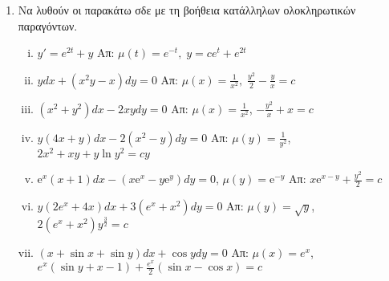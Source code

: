 \begin{enumerate}
  \item Να λυθούν οι παρακάτω σδε με τη βοήθεια κατάλληλων ολοκληρωτικών παραγόντων.

    \begin{enumerate}[i)]

      \item $ y' = e^{2t}+y $ \hfill Απ: $ \mu (t) = e^{-t}, \; y=ce^{t}+e^{2t} $ 
      \item $ ydx+(x^{2}y-x)dy=0 $ \hfill Απ: $ \mu (x) = \frac{1}{x^{2}}, \;
        \frac{y^{2}}{2} - \frac{y}{x} = c $ 
      \item $ (x^{2}+y^{2})dx - 2xydy = 0 $ 
        \hfill Απ: $\mu(x)= \frac{1}{x^{2}}$, $ - \frac{y^{2}}{x} + x = c $
      \item $ y(4x+y)dx-2(x^{2}-y)dy=0 $ 
        \hfill Απ: $ \mu(y)= \frac{1}{y^{2}} $, $ 2x^{2}+xy+ y \ln{y^{2}} =cy$ 
      \item $ \mathrm{e}^{x}(x+1)dx - (x \mathrm{e}^{x}-y \mathrm{e}^{y})dy = 0 $, \; 
        $ \mu(y) = \mathrm{e}^{-y} $
        \hfill Απ: $x \mathrm{e}^{x-y} + \frac{y^{2}}{2} = c $
      \item $ y(2e^{x}+4x)dx + 3(e^{x}+x^{2})dy = 0 $ 
        \hfill Απ: $ \mu(y)= \sqrt{ y } $, $ 2(e^{x}+x^{2})y^{\frac{3}{2}}=c $ 
      \item $ (x + \sin{x} + \sin{y})dx + \cos{y} dy =0 $ 
        \hfill Απ: $\mu(x)=e^{x} $, $ e^x(\sin{y} + x-1) + \frac{e^{x}}{2} 
        (\sin{x} - \cos{x})=c $
    \end{enumerate}


\end{enumerate}
